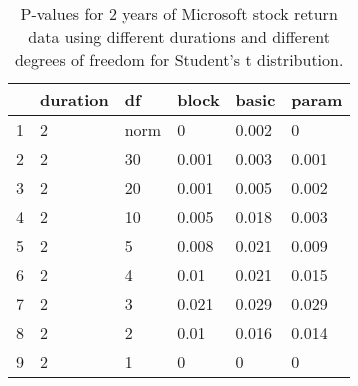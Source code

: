 \begin{table}[ht]
\centering
\caption{P-values for 2 years of Microsoft stock return 
                   data using different durations
  and different degrees of freedom for Student's t distribution.} 
\label{table:microsoft2}
\begin{tabular}{rlllll}
  \hline
 & duration & df & block & basic & param \\ 
  \hline
1 & 2 & norm & 0 & 0.002 & 0 \\ 
  2 & 2 & 30 & 0.001 & 0.003 & 0.001 \\ 
  3 & 2 & 20 & 0.001 & 0.005 & 0.002 \\ 
  4 & 2 & 10 & 0.005 & 0.018 & 0.003 \\ 
  5 & 2 & 5 & 0.008 & 0.021 & 0.009 \\ 
  6 & 2 & 4 & 0.01 & 0.021 & 0.015 \\ 
  7 & 2 & 3 & 0.021 & 0.029 & 0.029 \\ 
  8 & 2 & 2 & 0.01 & 0.016 & 0.014 \\ 
  9 & 2 & 1 & 0 & 0 & 0 \\ 
   \hline
\end{tabular}
\end{table}

